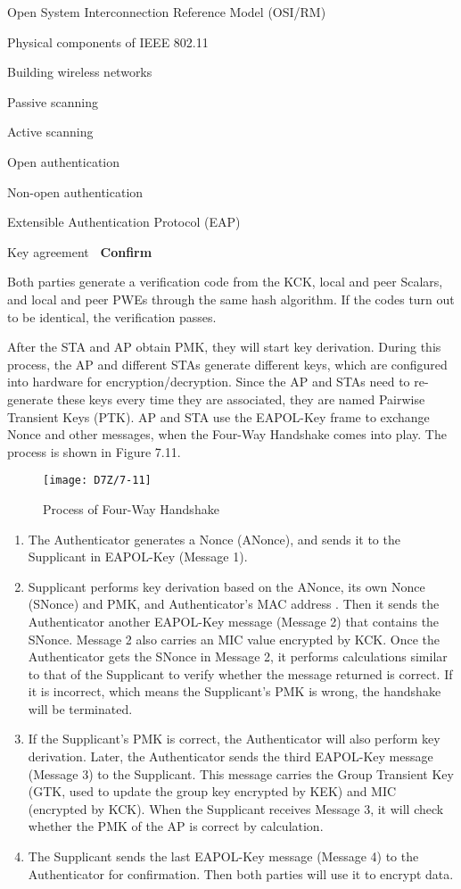 \documentclass[a4paper,12pt]{book}
\begin{document}
\begin{term}{Open System Interconnection Reference Model (OSI/RM)}
\begin{term}{Physical components of IEEE 802.11}
\begin{term}{Building wireless networks}
\begin{term}{Passive scanning}
\begin{term}{Active scanning}
\begin{term}{Open authentication}
\begin{term}{Non-open authentication}
\begin{term}{Extensible Authentication Protocol (EAP)}
\begin{term}{Key agreement}
    \textbf{\textbullet\ Confirm}
        
    Both parties generate a verification code from the KCK, local and peer Scalars, and local and peer PWEs through the same hash algorithm. If the codes turn out to be identical, the verification passes.
    
    After the STA and AP obtain PMK, they will start key derivation. During this process, the AP and different STAs generate different keys, which are configured into hardware for encryption/decryption. Since the AP and STAs need to re-generate these keys every time they are associated, they are named Pairwise Transient Keys (PTK). AP and STA use the EAPOL-Key frame to exchange Nonce and other messages, when the Four-Way Handshake comes into play. The process is shown in Figure 7.11.

    \begin{figure}[!h]
        \centering
        \texttt{[image: D7Z/7-11]}
        \caption{Process of Four-Way Handshake}
    \end{figure}

    \begin{enumerate}[label=(\arabic*)]
        \item The Authenticator generates a Nonce (ANonce), and sends it to the Supplicant in EAPOL-Key (Message 1).
        \item Supplicant performs key derivation based on the ANonce, its own Nonce (SNonce) and PMK, and Authenticator's MAC address . Then it sends the Authenticator another EAPOL-Key message (Message 2) that contains the SNonce. Message 2 also carries an MIC value encrypted by KCK. Once the Authenticator gets the SNonce in Message 2, it performs calculations similar to that of the Supplicant to verify whether the message returned is correct. If it is incorrect, which means the Supplicant’s PMK is wrong, the handshake will be terminated.
        \item If the Supplicant’s PMK is correct, the Authenticator will also perform key derivation. Later, the Authenticator sends the third EAPOL-Key message (Message 3) to the Supplicant. This message carries the Group Transient Key (GTK, used to update the group key encrypted by KEK) and MIC (encrypted by KCK). When the Supplicant receives Message 3, it will check whether the PMK of the AP is correct by calculation.
        \item The Supplicant sends the last EAPOL-Key message (Message 4) to the Authenticator for confirmation. Then both parties will use it to encrypt data.
    \end{enumerate}


\end{term}
\end{term}
\end{term}
\end{term}
\end{term}
\end{term}
\end{term}
\end{term}
\end{term}
\end{document}
